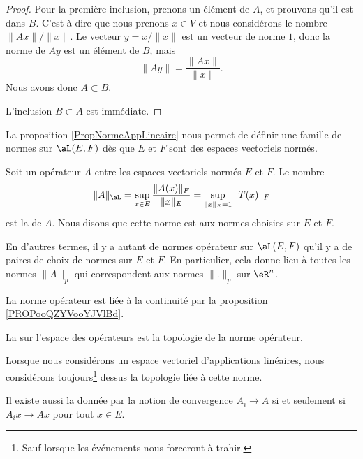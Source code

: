 \begin{proof}
    Pour la première inclusion, prenons un élément de \( A\), et prouvons qu'il est dans \( B\). C'est à dire que nous prenons \( x\in V\) et nous considérons le nombre \( \| Ax \|/\| x \|\). Le vecteur \( y=x/\| x \|\) est un vecteur de norme $1$, donc la norme de \( Ay\) est un élément de \( B\), mais
    \begin{equation}
        \| Ay \|=\frac{ \| Ax \| }{ \| x \| }.
    \end{equation}
    Nous avons donc \( A\subset B\).

    L'inclusion \( B\subset A\) est immédiate.
\end{proof}

La proposition \ref{PropNormeAppLineaire} nous permet de définir une famille de normes sur \( \aL(E,F)\) dès que \( E\) et \( F\) sont des espaces vectoriels normés.
\begin{definition}          \label{DefNFYUooBZCPTr}
    Soit un opérateur \( A\) entre les espaces vectoriels normés \( E\) et \( F\). Le nombre
    \begin{equation}
        \| A \|_{\aL}=\sup_{x\in E}\frac{\|A(x)\|_{F}}{\|x\|_{E}} =\sup_{\|x\|_{E}=1}\|T(x)\|_{F}
    \end{equation}
    est la  de $A$. Nous disons que cette norme est  aux normes choisies sur \( E\) et \( F\). 
\end{definition}
En d'autres termes, il y a autant de normes opérateur sur \( \aL(E,F)\) qu'il y a de paires de choix de normes sur \( E\) et \( F\). En particulier, cela donne lieu à toutes les normes \( \| A \|_p\) qui correspondent aux normes \( \| . \|_p\) sur \( \eR^n\). 

La norme opérateur est liée à la continuité par la proposition \ref{PROPooQZYVooYJVlBd}.

\begin{definition}
    La  sur l'espace des opérateurs est la topologie de la norme opérateur.  
\end{definition}
Lorsque nous considérons un espace vectoriel d'applications linéaires, nous considérons toujours\footnote{Sauf lorsque les événements nous forceront à trahir.} dessus la topologie liée à cette norme. 

Il existe aussi la  donnée par la notion de convergence \( A_i\to A\) si et seulement si \( A_ix\to Ax\) pour tout \( x\in E\).

